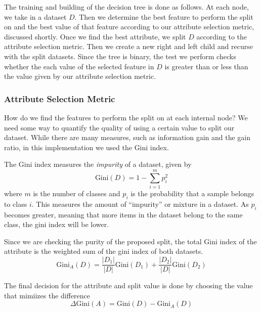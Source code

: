 \documentclass[
  paper=a4,
,captions=tableheading
]{scrartcl}
\begin{document}
The training and building of the decision tree is done as follows. At
each node, we take in a dataset \(D\). Then we determine the best
feature to perform the split on and the best value of that feature
according to our attribute selection metric, discussed shortly. Once we
find the best attribute, we split \(D\) according to the attribute
selection metric. Then we create a new right and left child and recurse
with the split datasets. Since the tree is binary, the test we perform
checks whether the each value of the selected feature in \(D\) is
greater than or less than the value given by our attribute selection
metric.

\hypertarget{attribute-selection-metric}{%
\subsubsection{Attribute Selection
Metric}\label{attribute-selection-metric}}

How do we find the features to perform the split on at each internal
node? We need some way to quantify the quality of using a certain value
to split our dataset. While there are many measures, such as information
gain and the gain ratio, in this implementation we used the Gini index.

The Gini index measures the \emph{impurity} of a dataset, given by
\begin{equation}
    \textrm{Gini}(D) = 1 - \sum_{i=1}^{m}p_{i}^{2}
\end{equation} where \(m\) is the number of classes and \(p_{i}\) is the
probability that a sample belongs to class \(i\). This measures the
amount of ``impurity'' or mixture in a dataset. As \(p_{i}\) becomes
greater, meaning that more items in the dataset belong to the same
class, the gini index will be lower.

Since we are checking the purity of the proposed split, the total Gini
index of the attribute is the weighted sum of the gini index of both
datasets. \begin{equation}
\textrm{Gini}_{A}(D) = \frac{|D_{1}|}{|D|}\textrm{Gini}(D_{1}) + \frac{|D_{2}|}{|D|}\textrm{Gini}(D_{2})
\end{equation}

The final decision for the attribute and split value is done by choosing
the value that mimiizes the difference \begin{equation}
\Delta\textrm{Gini}(A) = \textrm{Gini}(D) - \textrm{Gini}_{A}(D)
\end{equation}
\end{document}
